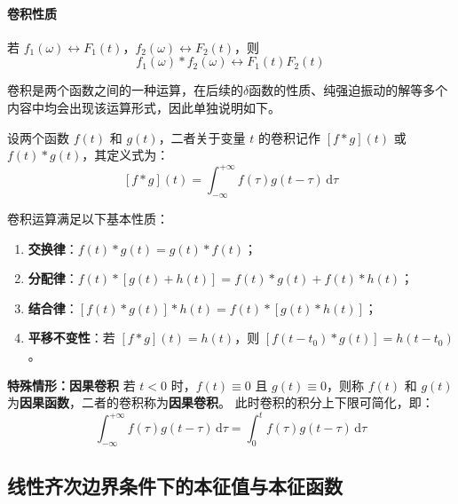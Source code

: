 \documentclass{article}
\begin{document}
	\paragraph{卷积性质}
	
	若 \( f_1(\omega) \leftrightarrow F_1(t) \)，\( f_2(\omega) \leftrightarrow F_2(t) \)，则
	\[
	f_1(\omega) * f_2(\omega) \leftrightarrow F_1(t) F_2(t)
	\]
	
	
	
	\begin{tcolorbox}[
		colback=blue!5,       %
		colframe=blue!70,     %
		rounded corners,      %
		title=卷积定义与理解, %
		fonttitle=\bfseries,  %
		left=1em,             %
		right=1em,
		top=0.5em,
		bottom=0.5em
		]
		卷积是两个函数之间的一种运算，在后续的$\delta$函数的性质、纯强迫振动的解等多个内容中均会出现该运算形式，因此单独说明如下。
		
		设两个函数 $f(t)$ 和 $g(t)$，二者关于变量 $t$ 的卷积记作 $\left[f\ast g\right](t)$ 或 $f(t)\ast g(t)$，其定义式为：
		\[
		\left[f\ast g\right](t)=\int_{-\infty}^{+\infty}f(\tau)g(t-\tau)\,\mathrm{d}\tau
		\]
		
		卷积运算满足以下基本性质：
		\begin{enumerate}[label=\arabic*., leftmargin=2em, itemsep=0.3em]
			\item \textbf{交换律}：$f(t)\ast g(t)=g(t)\ast f(t)$；
			\item \textbf{分配律}：$f(t)\ast\left[g(t)+h(t)\right]=f(t)\ast g(t)+f(t)\ast h(t)$；
			\item \textbf{结合律}：$\left[f(t)\ast g(t)\right]\ast h(t)=f(t)\ast\left[g(t)\ast h(t)\right]$；
			\item \textbf{平移不变性}：若 $\left[f\ast g\right](t)=h(t)$，则 $\left[f(t-t_0)\ast g(t)\right]=h(t-t_0)$。
		\end{enumerate}
		
		\textbf{特殊情形：因果卷积}
		若 $t<0$ 时，$f(t)\equiv0$ 且 $g(t)\equiv0$，则称 $f(t)$ 和 $g(t)$ 为\textbf{因果函数}，二者的卷积称为\textbf{因果卷积}。
		此时卷积的积分上下限可简化，即：
		\[
		\int_{-\infty}^{+\infty}f(\tau)g(t-\tau)\,\mathrm{d}\tau=\int_{0}^{t}f(\tau)g(t-\tau)\,\mathrm{d}\tau
		\]
	\end{tcolorbox}
	
	\subsection{线性齐次边界条件下的本征值与本征函数}
	
\end{document}
